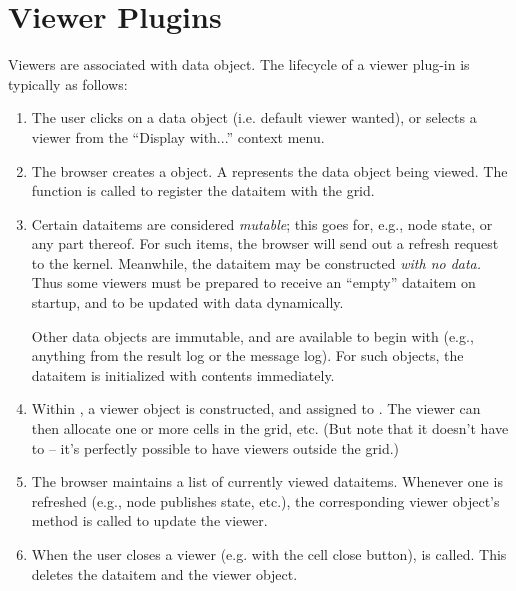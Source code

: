 \documentclass[12pt,twoside]{book}
\begin{document}
\section{Viewer Plugins}

  Viewers are associated with data object. The lifecycle of a viewer plug-in is
  typically as follows:
  
  \begin{enumerate} 
  
  \item The user clicks on a data object (i.e. default viewer wanted), or
  selects a viewer from the ``Display with...'' context menu.
  
  \item The browser creates a  object. A  
  represents the data object being viewed. The  
  function is called to register the dataitem with the grid.
  
  \item Certain dataitems are considered {\em mutable}; this goes for, e.g.,
  node state, or any part thereof. For such items, the browser will send out a
  refresh request to the kernel. Meanwhile, the dataitem may be constructed {\em
  with no data.} Thus some viewers must be prepared to receive an ``empty''
  dataitem on startup, and to be updated with data dynamically.

  Other data objects are immutable, and are available to begin with (e.g.,
  anything from the result log or the message log). For such objects, the
  dataitem is initialized with contents immediately.

  \item Within , a viewer object is constructed, and assigned
  to . The viewer can then allocate one or more cells
  in the grid, etc. (But note that it doesn't have to -- it's perfectly possible
  to have viewers outside the grid.)

  \item The browser maintains a list of currently viewed dataitems. Whenever 
  one is refreshed (e.g., node publishes state, etc.), the corresponding viewer
  object's  method is called to update the viewer.

  \item When the user closes a viewer (e.g. with the cell close button),
   is called. This deletes the dataitem and the
  viewer object.

  \end{enumerate}
  
\end{document}
